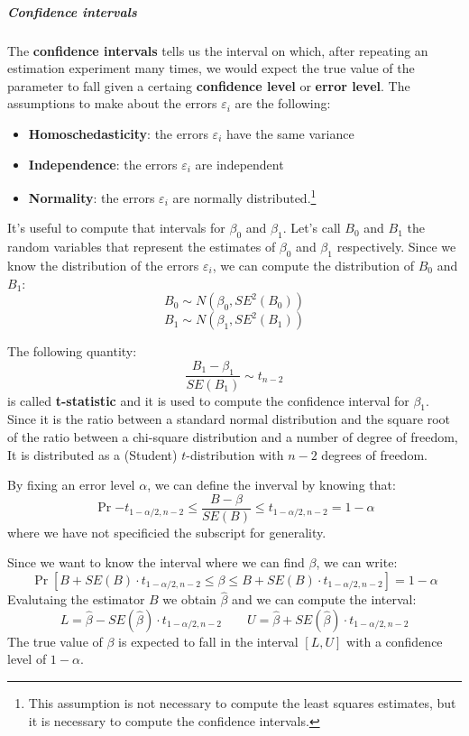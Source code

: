 \subparagraph*{Confidence intervals}
The \textbf{confidence intervals} tells us the interval on which, after repeating an estimation experiment many times, we would expect the true value of the parameter to fall given a certaing \textbf{confidence level} or \textbf{error level}.
The assumptions to make about the errors $\varepsilon_i$ are the following:
\begin{itemize}
    \item \textbf{Homoschedasticity}: the errors $\varepsilon_i$ have the same variance
    \item \textbf{Independence}: the errors $\varepsilon_i$ are independent
    \item \textbf{Normality}: the errors $\varepsilon_i$ are normally distributed.\footnote{This assumption is not necessary to compute the least squares estimates, but it is necessary to compute the confidence intervals.}
\end{itemize}
It's useful to compute that intervals for $\beta_0$ and $\beta_1$. 
Let's call $B_0$ and $B_1$ the random variables that represent the estimates of $\beta_0$ and $\beta_1$ respectively. Since we know the distribution of the errors $\varepsilon_i$, we can compute the distribution of $B_0$ and $B_1$:
\[
    B_0 \sim N(\beta_0, SE^2(B_0))
\]
\[
    B_1 \sim N(\beta_1, SE^2(B_1))
\]

The following quantity:
\[
    \frac{B_1 - \beta_1}{SE(B_1)} \sim t_{n-2}
\]
is called \textbf{t-statistic} and it is used to compute the confidence interval for $\beta_1$. Since it is the ratio between a standard normal distribution and the square root of the ratio between a chi-square distribution and a number of degree of freedom, It is distributed as a (Student) $t$-distribution with $n-2$ degrees of freedom. %

By fixing an error level $\alpha$, we can define the inverval by knowing that:
\[
    \Pr{-t_{1-\alpha/2, n-2} \leq \frac{B- \beta}{SE(B)} \leq t_{1-\alpha/2, n-2}} = 1 - \alpha
\]
where we have not specificied the subscript for generality.

Since we want to know the interval where we can find $\beta$, we can write:
\[
    \Pr[B+SE(B)\cdot t_{1-\alpha/2, n-2} \leq \beta \leq B+SE(B)\cdot t_{1-\alpha/2, n-2}] = 1 - \alpha
\]
Evalutaing the estimator $B$ we obtain $\hat \beta$ and we can compute the interval:
\[
    L = \hat \beta - SE(\hat \beta) \cdot t_{1-\alpha/2, n-2}
    \qquad
    U = \hat \beta + SE(\hat \beta) \cdot t_{1-\alpha/2, n-2}
\]
The true value of $\beta$ is expected to fall in the interval $[L, U]$ with a confidence level of $1-\alpha$.

